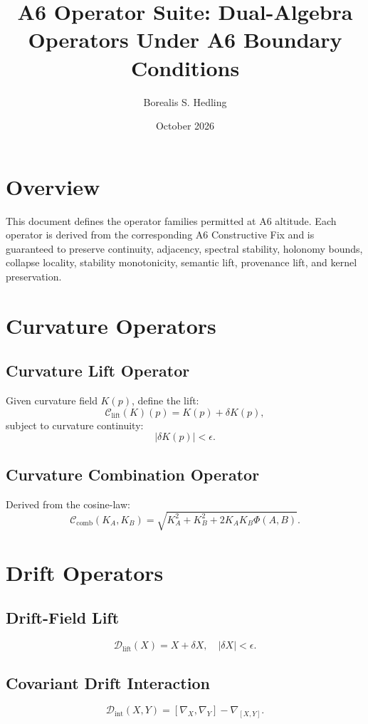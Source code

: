 \documentclass[11pt]{article}
\title{A6 Operator Suite: Dual-Algebra Operators Under A6 Boundary Conditions}
\author{Borealis S. Hedling}
\date{October 2026}
\begin{document}
\maketitle

\section*{Overview}

This document defines the operator families permitted at A6 altitude.
Each operator is derived from the corresponding A6 Constructive Fix and
is guaranteed to preserve continuity, adjacency, spectral stability,
holonomy bounds, collapse locality, stability monotonicity, semantic lift,
provenance lift, and kernel preservation.

\section{Curvature Operators}

\subsection{Curvature Lift Operator}
Given curvature field $K(p)$, define the lift:
\[
\mathcal{C}_{\mathrm{lift}}(K)(p) = K(p) + \delta K(p),
\]
subject to curvature continuity:
\[
|\delta K(p)| < \epsilon.
\]

\subsection{Curvature Combination Operator}
Derived from the cosine-law:
\[
\mathcal{C}_{\mathrm{comb}}(K_A, K_B)
  = \sqrt{K_A^2 + K_B^2 + 2 K_A K_B \Phi(A,B)}.
\]

\section{Drift Operators}

\subsection{Drift-Field Lift}
\[
\mathcal{D}_{\mathrm{lift}}(X) = X + \delta X,
\quad |\delta X| < \epsilon.
\]

\subsection{Covariant Drift Interaction}
\[
\mathcal{D}_{\mathrm{int}}(X,Y)
  = [\nabla_X,\nabla_Y] - \nabla_{[X,Y]}.
\]
\end{document}
